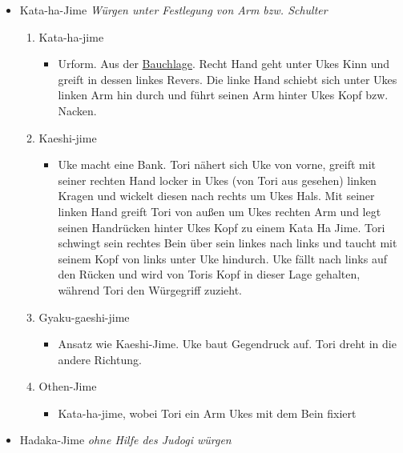 \documentclass[justified, a4paper, notitlepage, captions=tableheading, nobib]{tufte-handout}
\begin{document}
\begin{itemize}
\item Kata-ha-Jime 
\emph{Würgen unter Festlegung von Arm bzw. Schulter}

\begin{enumerate}
\item Kata-ha-jime 
\begin{itemize}
\item Urform. Aus der \hyperref[orgffa54d6]{Bauchlage}. Recht Hand geht unter Ukes Kinn und greift in dessen linkes Revers. Die linke Hand schiebt sich unter Ukes linken Arm hin durch und führt seinen Arm hinter Ukes Kopf bzw. Nacken.
\end{itemize}
\item Kaeshi-jime 
\begin{itemize}
\item Uke macht eine Bank. Tori nähert sich Uke von vorne, greift mit seiner rechten Hand locker in Ukes (von Tori aus gesehen) linken Kragen und wickelt diesen nach rechts um Ukes Hals. Mit seiner linken Hand greift Tori von außen um Ukes rechten Arm und legt seinen Handrücken hinter Ukes Kopf zu einem Kata Ha Jime. Tori schwingt sein rechtes Bein über sein linkes nach links und taucht mit seinem Kopf von links unter Uke hindurch. Uke fällt nach links auf den Rücken und wird von Toris Kopf in dieser Lage gehalten, während Tori den Würgegriff zuzieht.
\end{itemize}
\item Gyaku-gaeshi-jime 
\begin{itemize}
\item Ansatz wie Kaeshi-Jime. Uke baut Gegendruck auf. Tori dreht in die andere Richtung.
\end{itemize}
\item Othen-Jime 
\begin{itemize}
\item Kata-ha-jime, wobei Tori ein Arm Ukes mit dem Bein fixiert
\end{itemize}
\end{enumerate}

\item Hadaka-Jime 
\emph{ohne Hilfe des Judogi würgen}


\end{itemize}
\end{document}
